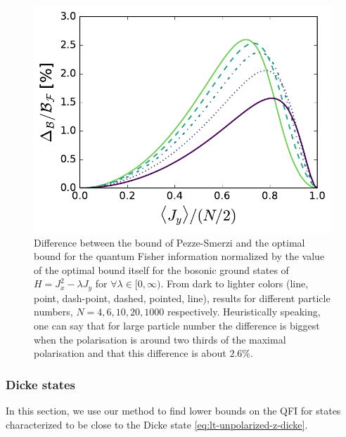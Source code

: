 \begin{figure}
  \centering
  \includegraphics[scale=.65]{img/plots/LT_edge_diff.pdf}
  \caption{Difference between the bound of Pezze-Smerzi and the optimal bound for the quantum Fisher information normalized by the value of the optimal bound itself for the bosonic ground states of $H=J_x^2-\lambda J_y$ for $\forall \lambda \in [0,\infty)$.
  From dark to lighter colors (line, point, dash-point, dashed, pointed, line), results for different particle numbers, $N=4,6,10,20,1000$ respectively.
  Heuristically speaking, one can say that for large particle number the difference is biggest when the polarisation is around two thirds of the maximal polarisation and that this difference is about $2.6\%$.}
  \label{fig:lt-edge-diff}
\end{figure}

\subsubsection{Dicke states}
In this section, we use our method to find lower bounds on the QFI for states characterized to be close to the Dicke state \eqref{eq:lt-unpolarized-z-dicke}.

\begin{figure}
  \centering
  \caption{}
  \label{fig:lt-spsq-scaling}
\end{figure}

